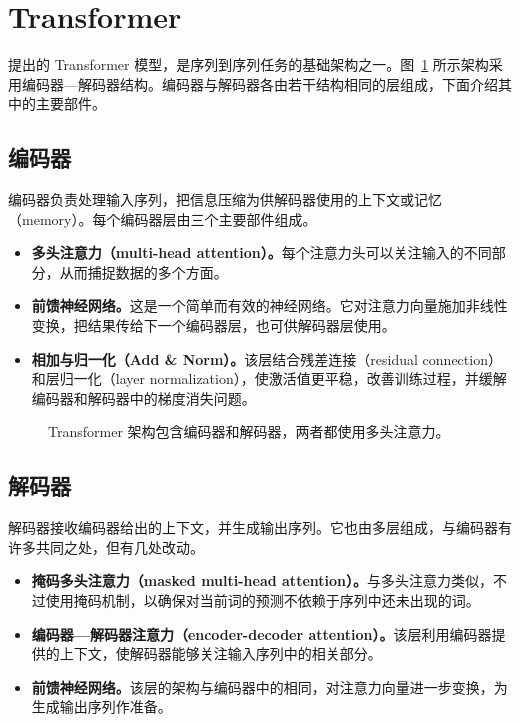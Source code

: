 \section{Transformer}
\label{sec:ch02-transformer}
提出的 Transformer 模型，是序列到序列任务的基础架构之一。图~\ref{fig:ch02-transformer} 所示架构采用编码器—解码器结构。编码器与解码器各由若干结构相同的层组成，下面介绍其中的主要部件。

\subsection{编码器}
编码器负责处理输入序列，把信息压缩为供解码器使用的上下文或记忆（memory）。每个编码器层由三个主要部件组成。
\begin{itemize}
\item \textbf{多头注意力（multi-head attention）。}每个注意力头可以关注输入的不同部分，从而捕捉数据的多个方面。
\item \textbf{前馈神经网络。}这是一个简单而有效的神经网络。它对注意力向量施加非线性变换，把结果传给下一个编码器层，也可供解码器层使用。
\item \textbf{相加与归一化（Add \& Norm）。}该层结合残差连接（residual connection）和层归一化（layer normalization），使激活值更平稳，改善训练过程，并缓解编码器和解码器中的梯度消失问题。
\end{itemize}

\begin{figure}[!htbp]
\centering

\caption{Transformer 架构包含编码器和解码器，两者都使用多头注意力。}
\label{fig:ch02-transformer}
\end{figure}

\subsection{解码器}
解码器接收编码器给出的上下文，并生成输出序列。它也由多层组成，与编码器有许多共同之处，但有几处改动。
\begin{itemize}
\item \textbf{掩码多头注意力（masked multi-head attention）。}与多头注意力类似，不过使用掩码机制，以确保对当前词的预测不依赖于序列中还未出现的词。
\item \textbf{编码器—解码器注意力（encoder-decoder attention）。}该层利用编码器提供的上下文，使解码器能够关注输入序列中的相关部分。
\item \textbf{前馈神经网络。}该层的架构与编码器中的相同，对注意力向量进一步变换，为生成输出序列作准备。
\end{itemize}

